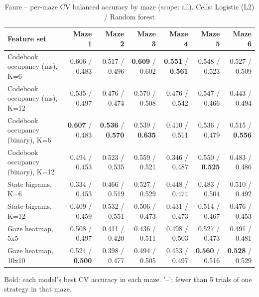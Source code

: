 \begin{table}[t]
\centering
\caption{Faure -- per-maze CV balanced accuracy by maze (scope: all). Cells: Logistic (L2) / Random forest}
\label{tab:permaze_by_maze_Faure}
\begin{tabular}{lrrrrrr}
\toprule
Feature set & Maze 1 & Maze 2 & Maze 3 & Maze 4 & Maze 5 & Maze 6 \\
\midrule
Codebook occupancy (ms), K=6 & 0.606 / 0.483 & 0.517 / 0.496 & \textbf{0.609} / 0.602 & \textbf{0.551} / \textbf{0.561} & 0.548 / 0.523 & 0.527 / 0.509 \\
Codebook occupancy (ms), K=12 & 0.535 / 0.497 & 0.476 / 0.474 & 0.570 / 0.508 & 0.476 / 0.542 & 0.547 / 0.466 & 0.443 / 0.494 \\
Codebook occupancy (binary), K=6 & \textbf{0.607} / 0.483 & \textbf{0.536} / \textbf{0.570} & 0.539 / \textbf{0.635} & 0.410 / 0.511 & 0.536 / 0.479 & 0.515 / \textbf{0.556} \\
Codebook occupancy (binary), K=12 & 0.494 / 0.453 & 0.523 / 0.535 & 0.559 / 0.521 & 0.346 / 0.487 & 0.550 / \textbf{0.525} & 0.483 / 0.486 \\
State bigrams, K=6 & 0.334 / 0.453 & 0.466 / 0.519 & 0.527 / 0.529 & 0.448 / 0.474 & 0.483 / 0.504 & 0.510 / 0.492 \\
State bigrams, K=12 & 0.409 / 0.459 & 0.532 / 0.551 & 0.506 / 0.473 & 0.431 / 0.473 & 0.514 / 0.467 & 0.476 / 0.453 \\
Gaze heatmap, 5x5 & 0.508 / 0.497 & 0.411 / 0.420 & 0.436 / 0.511 & 0.498 / 0.503 & 0.527 / 0.473 & 0.491 / 0.481 \\
Gaze heatmap, 10x10 & 0.524 / \textbf{0.500} & 0.398 / 0.477 & 0.494 / 0.505 & 0.453 / 0.497 & \textbf{0.560} / 0.516 & \textbf{0.528} / 0.529 \\
\bottomrule
\end{tabular}
\par\smallskip
{\footnotesize Bold: each model's best CV accuracy in each maze. '--': fewer than 5 trials of one strategy in that maze.}
\end{table}

